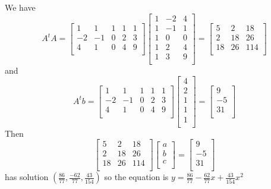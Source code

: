 \documentclass{article}
\begin{document}
\begin{example}
  We have \[
    A^tA =
    \begin{bmatrix}
      1  & 1  & 1 & 1 & 1 \\
      -2 & -1 & 0 & 2 & 3 \\
      4  & 1  & 0 & 4 & 9 \\
    \end{bmatrix}
    \begin{bmatrix}
      1 & -2 & 4 \\
      1 & -1 & 1 \\
      1 & 0  & 0 \\
      1 & 2  & 4 \\
      1 & 3  & 9 \\
    \end{bmatrix} =
    \begin{bmatrix}
      5  & 2  & 18  \\
      2  & 18 & 26  \\
      18 & 26 & 114 \\
    \end{bmatrix}
  \] and \[
    A^tb =
    \begin{bmatrix}
      1  & 1  & 1 & 1 & 1 \\
      -2 & -1 & 0 & 2 & 3 \\
      4  & 1  & 0 & 4 & 9 \\
    \end{bmatrix}
    \begin{bmatrix}
      4 \\2\\1\\1\\1\\
    \end{bmatrix} =
    \begin{bmatrix}
      9 \\-5\\31\\
    \end{bmatrix}
  \]
  Then \[
    \begin{bmatrix}
      5  & 2  & 18  \\
      2  & 18 & 26  \\
      18 & 26 & 114 \\
    \end{bmatrix}
    \begin{bmatrix}
      a \\b\\c\\
    \end{bmatrix} =
    \begin{bmatrix}
      9 \\-5\\31\\
    \end{bmatrix}
  \] has solution $\left(\frac{86}{77}, \frac{-62}{77}, \frac{43}{154}\right)$ so the equation is $y = \frac{86}{77} - \frac{62}{77}x + \frac{43}{154}x^2$
\end{example}
\end{document}
